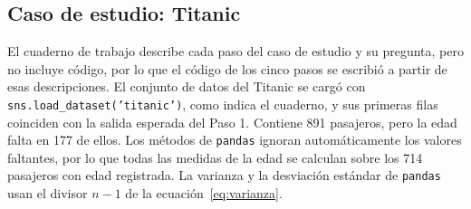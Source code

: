 \documentclass[11pt,letterpaper]{article}
\begin{document}
\subsection{Caso de estudio: Titanic}

El cuaderno de trabajo describe cada paso del caso de estudio y su pregunta, pero no incluye código, por lo que el código de los cinco pasos se escribió a partir de esas descripciones. El conjunto de datos del Titanic se cargó con \texttt{sns.load\_dataset('titanic')}, como indica el cuaderno, y sus primeras filas coinciden con la salida esperada del Paso 1. Contiene 891 pasajeros, pero la edad falta en 177 de ellos. Los métodos de \texttt{pandas} ignoran automáticamente los valores faltantes, por lo que todas las medidas de la edad se calculan sobre los 714 pasajeros con edad registrada. La varianza y la desviación estándar de \texttt{pandas} usan el divisor $n - 1$ de la ecuación~\eqref{eq:varianza}.
\end{document}
